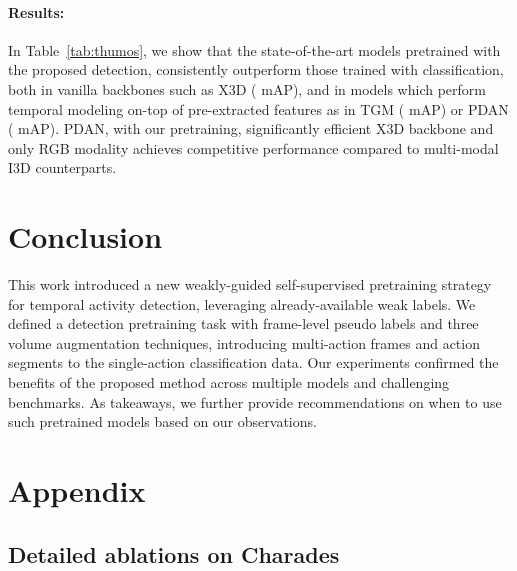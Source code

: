 \documentclass[letterpaper]{article} \usepackage{aaai23}  \usepackage{times}  \usepackage{helvet}  \usepackage{courier}  \usepackage[hyphens]{url}  \usepackage{graphicx} \urlstyle{rm} \def\UrlFont{\rm}  \usepackage{natbib}  \usepackage{caption} \frenchspacing  \setlength{\pdfpagewidth}{8.5in}  \setlength{\pdfpageheight}{11in}  \usepackage{algorithm}
\newcommand{\tref}[1]{Table~\ref{#1}}
\newcommand{\ch}{}
\begin{document}
\paragraph{Results:}
\label{subsubsec:main_results_thumos}

In \tref{tab:thumos}, we show that the state-of-the-art models pretrained with the proposed detection, consistently outperform those trained with classification, both in vanilla backbones such as X3D \cite{feichtenhofer2020x3d} ( mAP), and in models which perform temporal modeling on-top of pre-extracted features as in TGM \cite{piergiovanni2019temporal} ( mAP) or PDAN \cite{dai2021pdan} ( mAP). PDAN, with our pretraining, significantly efficient X3D backbone and only RGB modality achieves competitive performance compared to multi-modal I3D \cite{carreira2017quo} counterparts.



\section{Conclusion}
\label{sec:conclusion}

\ch{This work introduced a new weakly-guided self-supervised pretraining strategy for temporal activity detection, leveraging already-available weak labels.} We defined a detection pretraining task with frame-level pseudo labels and three volume augmentation techniques, introducing multi-action frames and action segments to the single-action classification data. Our experiments confirmed the benefits of the proposed method across multiple models and challenging benchmarks. As takeaways, we further provide recommendations on when to use such pretrained models based on our observations.






\section{Appendix}
\label{sec:appendix}

\renewcommand{\thesubsection}{A.\arabic{subsection}}
\renewcommand{\thesection}{\Alph{section}}
\setcounter{table}{0}
\setcounter{figure}{0}
\renewcommand{\thetable}{A.\arabic{table}}
\renewcommand{\thefigure}{A.\arabic{figure}}

\vspace{2mm}
\subsection{Detailed ablations on Charades}
\label{subsubsec:ablations}
\end{document}
